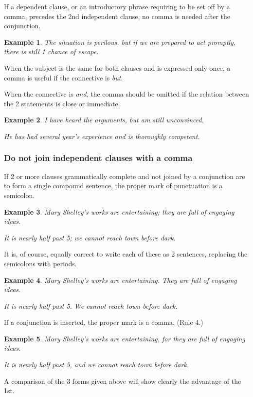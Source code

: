 \documentclass{article}
\newtheorem{example}{Example}
\begin{document}
%
If a dependent clause, or an introductory phrase requiring to be set off by a comma, precedes the 2nd independent clause, no comma is needed after the conjunction.
\begin{example}
	The situation is perilous, but if we are prepared to act promptly, there is still 1 chance of escape.
\end{example}
When the subject is the same for both clauses and is expressed only once, a comma is useful if the connective is {\it but}.

When the connective is {\it and}, the comma should be omitted if the relation between the 2 statements is close or immediate.
\begin{example}
	I have heard the arguments, but am still unconvinced.
	
	He has had several year's experience and is thoroughly competent.
\end{example}


\subsubsection{Do not join independent clauses with a comma}
If 2 or more clauses grammatically complete and not joined by a conjunction are to form a single compound sentence, the proper mark of punctuation is a semicolon.
\begin{example}
	Mary Shelley's works are entertaining; they are full of engaging ideas.
	
	It is nearly half past 5; we cannot reach town before dark.
\end{example}
It is, of course, equally correct to write each of these as 2 sentences, replacing the semicolons with periods.
\begin{example}
	Mary Shelley's works are entertaining. They are full of engaging ideas.
	
	It is nearly half past 5. We cannot reach town before dark.
\end{example}
If a conjunction is inserted, the proper mark is a comma. (Rule 4.)
\begin{example}
	Mary Shelley's works are entertaining, for they are full of engaging ideas.
	
	It is nearly half past 5, and we cannot reach town before dark.
\end{example}
A comparison of the 3 forms given above will show clearly the advantage of the 1st.
\end{document}
